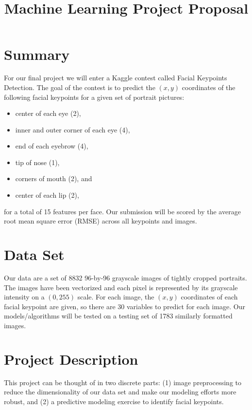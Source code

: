 \documentclass[conference]{IEEEtran}
\begin{document}
\title{Machine Learning Project Proposal}
\author{
\and
{}
}

\maketitle

\section{Summary}
For our final project we will enter a Kaggle contest called Facial Keypoints Detection. The goal of the contest is to predict the $(x,y)$ coordinates of the following facial keypoints for a given set of portrait pictures:
\begin{itemize}
\item center of each eye (2),
\item inner and outer corner of each eye (4),
\item end of each eyebrow (4),
\item tip of nose (1),
\item corners of mouth (2), and
\item center of each lip (2),
\end{itemize}
for a total of 15 features per face. Our submission will be scored by the average root mean square error (RMSE) across all keypoints and images.

\section{Data Set}
Our data are a set of \num{8832} 96-by-96 grayscale images of tightly cropped portraits. The images have been vectorized and each pixel is represented by its grayscale intensity on a $(0,255)$ scale. For each image, the $(x,y)$ coordinates of each facial keypoint are given, so there are 30 variables to predict for each image. Our models/algorithms will be tested on a testing set of \num{1783} similarly formatted images.

\section{Project Description}
This project can be thought of in two discrete parts: (1) image preprocessing to reduce the dimensionality of our data set and make our modeling efforts more robust, and (2) a predictive modeling exercise to identify facial keypoints.
\end{document}
